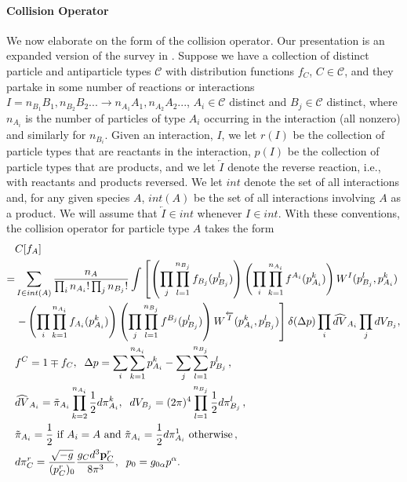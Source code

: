 \paragraph{Collision Operator}
We now elaborate on the form of the collision operator.  Our presentation is an expanded version of the survey in \cite{ehlers}.  Suppose we have a collection of  distinct particle and antiparticle types $\mathcal{C}$ with distribution functions $f_{C}$, $C\in\mathcal{C}$, and they partake in some number of reactions or interactions $I=n_{B_1} B_1, n_{B_2}B_2...\longrightarrow n_{A_1} A_1,n_{A_2}A_2...$, $A_i\in\mathcal{C}$ distinct and $B_j\in\mathcal{C}$ distinct, where $n_{A_i}$ is the number of particles of type $A_i$ occurring in the interaction (all nonzero) and similarly for $n_{B_i}$.  Given an interaction, $I$, we let $r(I)$ be the collection of particle types that are reactants in the interaction, $p(I)$ be the collection of particle types that are products, and we let $\overleftarrow{I}$ denote the reverse reaction, i.e., with reactants and products reversed.   We let $int$ denote the set of all interactions and, for any given species $A$, $int(A)$ be the set of all interactions involving $A$ as a   product.   We will assume that $\overleftarrow{I}\in int$ whenever $I\in int$.  With these conventions, the collision operator for particle type $A$ takes the form
\begin{align}\label{collision_operator}
&C[f_A]\\
=&\sum_{I\in int(A)} \frac{n_A}{\prod_i n_{A_i}!\prod _j n_{B_j}!}\int\left[\left(\prod_j \prod_{l=1}^{n_{B_j}}f_{B_j}(p_{B_j}^l)\right)\left(\prod_i \prod_{k=1}^{n_{A_i}}f^{A_i}(p_{A_i}^k)\right)W^I(p_{B_j}^l,p_{A_i}^k) \right.\notag\\
& \left. -\left(\prod_i \prod_{k=1}^{n_{A_i}}f_{A_i}(p_{A_i}^k)\right)\left(\prod_j \prod_{l=1}^{n_{B_j}}f^{B_j}(p_{B_j}^l)\right)W^{\overleftarrow{I}}(p_{A_i}^k,p_{B_j}^l) \right] \delta(\Delta p)\prod_i \widehat{dV}_{A_i}\prod_j dV_{B_j},\notag\\
&f^C=1\mp f_C, \hspace{2mm} \Delta p=\sum_i \sum_{k=1}^{n_{A_i}}p^k_{A_i}-\sum_j \sum_{l=1}^{n_{B_j}}p^l_{B_j}\,,\notag\\
&\widehat{dV}_{A_i}=\tilde{\pi}_{A_i}\prod_{k=2}^{n_{A_i}}\frac{1}{2}d\pi^k_{A_i}, \hspace{2mm}  dV_{B_j}=(2\pi)^4\prod_{l=1}^{n_{B_j}}\frac{1}{2}d\pi^l_{B_j}\,,\notag\\
&\tilde{\pi}_{A_i}=\frac{1}{2} \text{ if } A_i=A \text{ and }  \tilde{\pi}_{A_i}=\frac{1}{2}d\pi^1_{A_i} \text{ otherwise\,,} \notag\\
&d\pi_{C}^r=\frac{\sqrt{-g}}{(p_{C}^r)_0}\frac{g_{C}d^3{\bf p}_{C}^r}{8\pi^3}, \hspace{2mm}p_0=g_{0\alpha}p^\alpha.\notag
\end{align}
